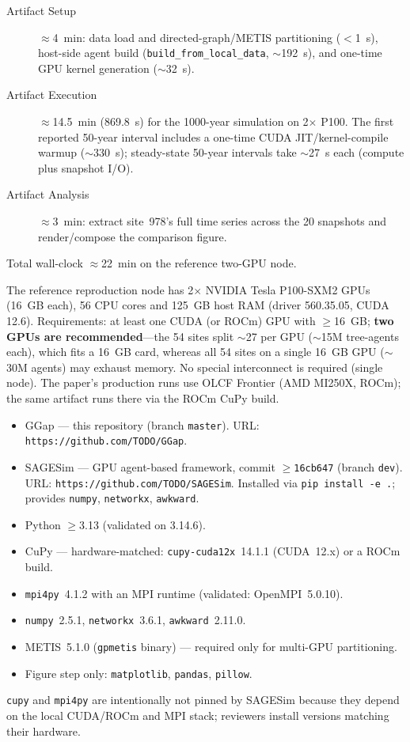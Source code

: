 \documentclass[conference]{IEEEtran}
\begin{document}
\arttime

\begin{description}
\item[Artifact Setup] $\approx$4~min: data load and directed-graph/METIS partitioning
  ($<$1~s), host-side agent build (\texttt{build\_from\_local\_data}, $\sim$192~s), and
  one-time GPU kernel generation ($\sim$32~s).
\item[Artifact Execution] $\approx$14.5~min (869.8~s) for the 1000-year simulation on
  2$\times$ P100. The first reported 50-year interval includes a one-time CUDA
  JIT/kernel-compile warmup ($\sim$330~s); steady-state 50-year intervals take
  $\sim$27~s each (compute plus snapshot I/O).
\item[Artifact Analysis] $\approx$3~min: extract site~978's full time series across the
  20 snapshots and render/compose the comparison figure.
\end{description}
Total wall-clock $\approx$22~min on the reference two-GPU node.

\artin


The reference reproduction node has 2$\times$ NVIDIA Tesla P100-SXM2 GPUs (16~GB each),
56 CPU cores and 125~GB host RAM (driver 560.35.05, CUDA 12.6). Requirements: at least
one CUDA (or ROCm) GPU with $\geq$16~GB; \textbf{two GPUs are recommended}---the 54
sites split $\sim$27 per GPU ($\sim$15M tree-agents each), which fits a 16~GB card,
whereas all 54 sites on a single 16~GB GPU ($\sim$30M agents) may exhaust memory. No
special interconnect is required (single node). The paper's production runs use OLCF
Frontier (AMD MI250X, ROCm); the same artifact runs there via the ROCm CuPy build.


\begin{itemize}
\item GGap --- this repository (branch \texttt{master}). URL: \texttt{https://github.com/TODO/GGap}.
\item SAGESim --- GPU agent-based framework, commit $\geq$\texttt{16cb647} (branch
  \texttt{dev}). URL: \texttt{https://github.com/TODO/SAGESim}. Installed via
  \texttt{pip install -e .}; provides \texttt{numpy}, \texttt{networkx}, \texttt{awkward}.
\item Python $\geq$3.13 (validated on 3.14.6).
\item CuPy --- hardware-matched: \texttt{cupy-cuda12x}~14.1.1 (CUDA~12.x) or a ROCm build.
\item \texttt{mpi4py}~4.1.2 with an MPI runtime (validated: OpenMPI~5.0.10).
\item \texttt{numpy}~2.5.1, \texttt{networkx}~3.6.1, \texttt{awkward}~2.11.0.
\item METIS~5.1.0 (\texttt{gpmetis} binary) --- required only for multi-GPU partitioning.
\item Figure step only: \texttt{matplotlib}, \texttt{pandas}, \texttt{pillow}.
\end{itemize}
\texttt{cupy} and \texttt{mpi4py} are intentionally not pinned by SAGESim because they
depend on the local CUDA/ROCm and MPI stack; reviewers install versions matching their
hardware.
\end{document}
